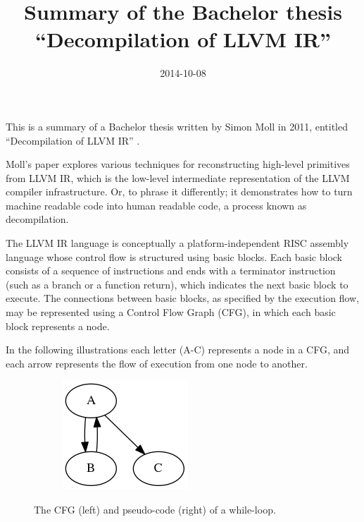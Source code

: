 \documentclass[12pt, a4paper]{article}
\title{Summary of the Bachelor thesis ``Decompilation of LLVM IR''}
\date{2014-10-08}
\begin{document}
\maketitle

This is a summary of a Bachelor thesis written by Simon Moll in 2011, entitled ``Decompilation of LLVM IR'' \cite{decomp_of_llvm}.

Moll's paper explores various techniques for reconstructing high-level primitives from LLVM IR, which is the low-level intermediate representation of the LLVM compiler infrastructure. Or, to phrase it differently; it demonstrates how to turn machine readable code into human readable code, a process known as decompilation.

The LLVM IR language is conceptually a platform-independent RISC assembly language whose control flow is structured using basic blocks. Each basic block consists of a sequence of instructions and ends with a terminator instruction (such as a branch or a function return), which indicates the next basic block to execute. The connections between basic blocks, as specified by the execution flow, may be represented using a Control Flow Graph (CFG), in which each basic block represents a node.

In the following illustrations each letter (A-C) represents a node in a CFG, and each arrow represents the flow of execution from one node to another.

\begin{figure}[H]
   \centering
   \begin{subfigure}[b]{0.2\textwidth}
      \includegraphics[width=\textwidth]{inc/pre_loop.png}
   \end{subfigure}
   \qquad
   \begin{subfigure}[b]{0.2\textwidth}
      
   \end{subfigure}
   \caption{The CFG (left) and pseudo-code (right) of a while-loop.}
\end{figure}
\end{document}
